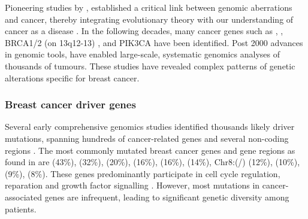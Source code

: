 Pioneering studies by \textcite{Stehelin1976-jr, Nowell1960-eh}, established a critical link between genomic aberrations and cancer, thereby integrating evolutionary theory with our understanding of cancer as a disease \parencite{Cairns1975-oz,Nowell1976-sm}. In the following decades, many cancer genes such as  \parencite{Lane1979-hx},  \parencite{Kohl1984-ri}, BRCA1/2 (on 13q12-13) \parencite{Wooster1994-xa, Hall1990-mg} \parencite{Wooster1994-xa, Hall1990-mg} , and PIK3CA \parencite{Chang1997-sa} have been identified. Post 2000 advances in genomic tools, have enabled large-scale, systematic genomics analyses of thousands of tumours. These studies have revealed complex patterns of genetic alterations specific for breast cancer.



\subsubsection*{Breast cancer driver genes}
Several early comprehensive genomics studies identified thousands likely driver mutations, spanning hundreds of cancer-related genes and several non-coding regions \parencite{Shah2009-xz, Cancer_Genome_Atlas_Network2012-gx,Shah2012-xz, Nik-Zainal2016-ek,Banerji2012-as,Ciriello2015-ey,Stephens2012-vj,Pereira2016-ov, Curtis2012-hu}. The most commonly mutated breast cancer genes and gene regions as found in \textcite{Cancer_Genome_Atlas_Network2012-gx} are  (43\%),  (32\%),  (20\%),  (16\%),  (16\%),  (14\%), Chr8:(/) (12\%),  (10\%),  (9\%),  (8\%). These genes predominantly participate in cell cycle regulation, reparation and growth factor signalling . However, most mutations in cancer-associated genes are infrequent, leading to significant genetic diversity among patients. 

